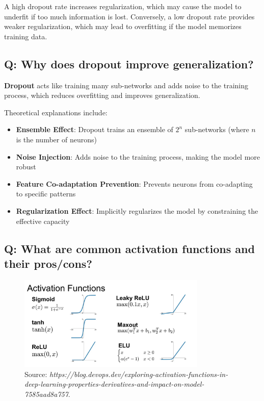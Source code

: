 A high dropout rate increases regularization, which may cause the model to underfit if too much information is lost. Conversely, a low dropout rate provides weaker regularization, which may lead to overfitting if the model memorizes training data.

\subsection*{Q: Why does dropout improve generalization?}
\textbf{Dropout} acts like training many sub-networks and adds noise to the training process, which reduces overfitting and improves generalization.

Theoretical explanations include:
\begin{itemize}
	\item \textbf{Ensemble Effect}: Dropout trains an ensemble of \(2^n\) sub-networks (where \(n\) is the number of neurons)
	\item \textbf{Noise Injection}: Adds noise to the training process, making the model more robust
	\item \textbf{Feature Co-adaptation Prevention}: Prevents neurons from co-adapting to specific patterns
	\item \textbf{Regularization Effect}: Implicitly regularizes the model by constraining the effective capacity
\end{itemize}

\subsection*{Q: What are common activation functions and their pros/cons?}
\begin{figure}[H]
	\centering
	\includegraphics[width=0.8\textwidth]{activation.png}
	\caption{Source: \textit{https://blog.devops.dev/exploring-activation-functions-in-deep-learning-properties-derivatives-and-impact-on-model-7585aad8a757}.}
\end{figure}

